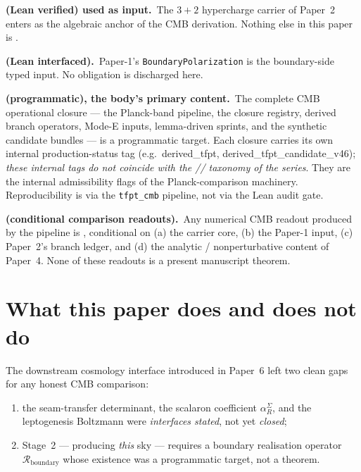 \documentclass[11pt,a4paper]{article}
\begin{document}
\begin{tfptstatusbox}
\textbf{ (Lean verified) used as input.}\ The $3+2$
hypercharge carrier of Paper~2 enters as the algebraic
anchor of the CMB derivation. Nothing else in this paper
is .

\smallskip
\textbf{ (Lean interfaced).}\ Paper-1's
\texttt{BoundaryPolarization} is the boundary-side typed
input. No  obligation is discharged here.

\smallskip
\textbf{ (programmatic), the body's primary content.}\
The complete CMB operational closure --- the Planck-band
pipeline, the closure registry, derived branch operators,
Mode-E inputs, lemma-driven sprints, and the synthetic
candidate bundles --- is a  programmatic target.
Each closure carries its own internal production-status tag
(e.g.\ \textsf{derived\_tfpt},
\textsf{derived\_tfpt\_candidate\_v46}); \emph{these internal
tags do not coincide with the //
taxonomy of the series}. They are the internal admissibility
flags of the Planck-comparison machinery. Reproducibility is
via the \texttt{tfpt\_cmb} pipeline, not via the Lean audit
gate.

\smallskip
\textbf{ (conditional comparison readouts).}\ Any
numerical CMB readout produced by the pipeline is ,
conditional on (a) the  carrier core, (b) the
 Paper-1 input, (c) Paper~2's  branch ledger,
and (d) the analytic / nonperturbative \stag{C} content of
Paper~4. None of these readouts is a present manuscript
theorem.
\end{tfptstatusbox}

\tableofcontents

\section{What this paper does and does not do}
\label{sec:what}

The downstream cosmology interface introduced in Paper~6 left two clean
gaps for any honest CMB comparison:
\begin{enumerate}[leftmargin=1.4em]
\item the seam-transfer determinant, the scalaron coefficient
\(\alpha_R^\Sigma\), and the leptogenesis Boltzmann were
\emph{interfaces stated}, not yet \emph{closed};
\item Stage~2 --- producing \emph{this} sky --- requires a boundary
realisation operator \(\mathcal R_{\mathrm{boundary}}\) whose existence
was a programmatic target, not a theorem.
\end{enumerate}
\end{document}
